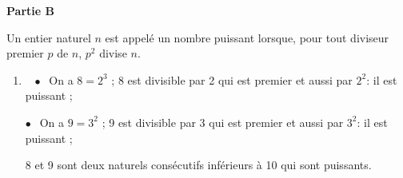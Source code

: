 \documentclass[10pt]{article}
\begin{document}
\bigskip

\textbf{Partie B}

\medskip

Un entier naturel $n$ est appelé un nombre puissant lorsque, pour tout diviseur premier $p$ de $n$,\: $p^2$ divise $n$.

\medskip

\begin{enumerate}
\item ~%
$\bullet~~$ On a $8 = 2^3$ ; 8 est divisible par 2 qui est premier et aussi par $2^2$: il est puissant ;

$\bullet~~$ On a $9 = 3^2$ ; 9 est divisible par 3 qui est premier et aussi par $3^2$: il est puissant ;

8 et 9 sont deux naturels consécutifs inférieurs à 10 qui sont puissants.
\end{enumerate}
\medskip


\medskip
\end{document}
